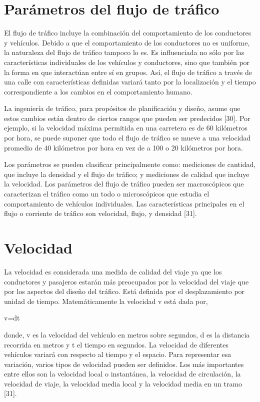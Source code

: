 \documentclass[final,fmstyle]{fpunathesis}
\begin{document}
\section{Parámetros del flujo de tráfico}

El flujo de tráfico incluye la combinación del comportamiento de los conductores y vehículos. Debido a que el comportamiento de los conductores no es uniforme, la naturaleza del flujo de tráfico tampoco lo es. Es influenciada no sólo por las características individuales de los vehículos y conductores, sino que también por la forma en que interactúan entre sí en grupos. Así, el flujo de tráfico a través de una calle con características definidas variará tanto por la localización y el tiempo correspondiente a los cambios en el comportamiento humano.

La ingeniería de tráfico, para propósitos de planificación y diseño, asume que estos cambios están dentro de ciertos rangos que pueden ser predecidos [30]. Por ejemplo, si la velocidad máxima permitida en una carretera es de 60 kilómetros por hora, se puede suponer que todo el flujo de tráfico se mueve a una velocidad promedio de 40 kilómetros por hora en vez de a 100 o 20 kilómetros por hora. 

Los parámetros se pueden clasificar principalmente como: mediciones de cantidad, que incluye la densidad y el flujo de tráfico; y mediciones de calidad que incluye la velocidad. Los parámetros del flujo de tráfico pueden ser macroscópicos que caracterizan el tráfico como un todo o microscópicos que estudia el comportamiento de vehículos individuales. Las características principales en el flujo o corriente de tráfico son velocidad, flujo, y densidad [31].

\section{Velocidad}

La velocidad es considerada una medida de calidad del viaje ya que los conductores y pasajeros estarán más preocupados por la velocidad del viaje que por los aspectos del diseño del tráfico. Está definida por el desplazamiento por unidad de tiempo. Matemáticamente la velocidad v está dada por,

v=dt

donde, v es la velocidad del vehículo en metros sobre segundos, d es la distancia recorrida en metros y t el tiempo en segundos. La velocidad de diferentes vehículos variará con respecto al tiempo y el espacio. Para representar esa variación, varios tipos de velocidad pueden ser definidos. Los más importantes entre ellos son la velocidad local o instantánea, la velocidad de circulación, la velocidad de viaje, la velocidad media local y la velocidad media en un tramo [31].
\end{document}
